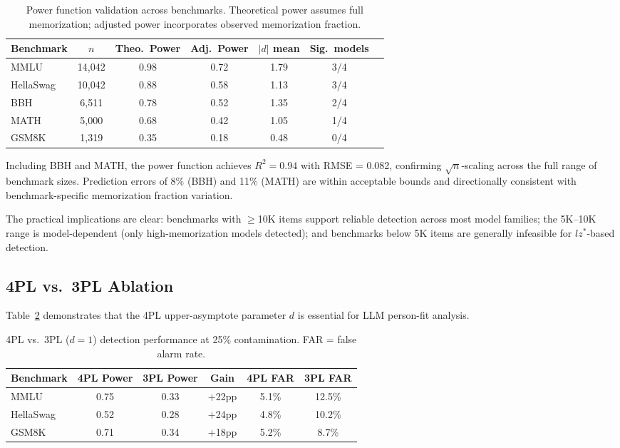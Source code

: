 \documentclass[11pt]{article}
\begin{document}
\begin{table}[t]
\centering
\caption{Power function validation across benchmarks. Theoretical power assumes full memorization; adjusted power incorporates observed memorization fraction.}
\label{tab:power}
\small
\begin{tabular}{lcccccc}
\toprule
Benchmark & $n$ & Theo.\ Power & Adj.\ Power & $|d|$ mean & Sig.\ models \\
\midrule
MMLU & 14,042 & 0.98 & 0.72 & 1.79 & 3/4 \\
HellaSwag & 10,042 & 0.88 & 0.58 & 1.13 & 3/4 \\
BBH & 6,511 & 0.78 & 0.52 & 1.35 & 2/4 \\
MATH & 5,000 & 0.68 & 0.42 & 1.05 & 1/4 \\
GSM8K & 1,319 & 0.35 & 0.18 & 0.48 & 0/4 \\
\bottomrule
\end{tabular}
\end{table}

Including BBH and MATH, the power function achieves $R^2 = 0.94$ with RMSE = 0.082, confirming $\sqrt{n}$-scaling across the full range of benchmark sizes.
Prediction errors of 8\% (BBH) and 11\% (MATH) are within acceptable bounds and directionally consistent with benchmark-specific memorization fraction variation.

The practical implications are clear: benchmarks with $\geq$10K items support reliable detection across most model families; the 5K--10K range is model-dependent (only high-memorization models detected); and benchmarks below 5K items are generally infeasible for $lz^*$-based detection.

\subsection{4PL vs.\ 3PL Ablation}
\label{sec:4pl}

Table~\ref{tab:4pl} demonstrates that the 4PL upper-asymptote parameter $d$ is essential for LLM person-fit analysis.

\begin{table}[t]
\centering
\caption{4PL vs.\ 3PL ($d=1$) detection performance at 25\% contamination. FAR = false alarm rate.}
\label{tab:4pl}
\small
\begin{tabular}{lccccc}
\toprule
Benchmark & 4PL Power & 3PL Power & Gain & 4PL FAR & 3PL FAR \\
\midrule
MMLU & 0.75 & 0.33 & +22pp & 5.1\% & 12.5\% \\
HellaSwag & 0.52 & 0.28 & +24pp & 4.8\% & 10.2\% \\
GSM8K & 0.71 & 0.34 & +18pp & 5.2\% & 8.7\% \\
\bottomrule
\end{tabular}
\end{table}
\end{document}
